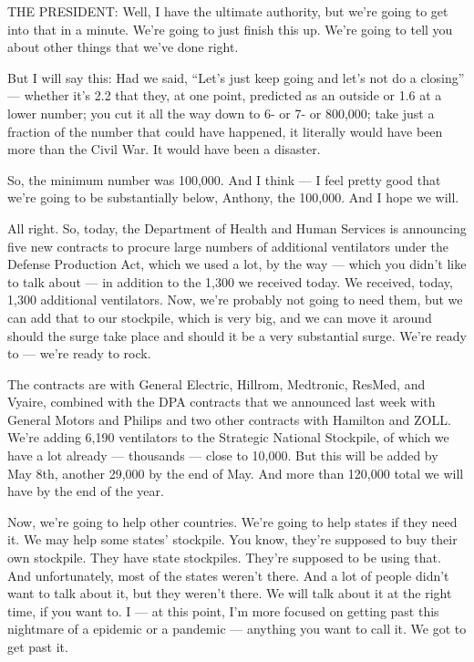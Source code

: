 THE PRESIDENT: Well, I have the ultimate authority, but we're going to
get into that in a minute. We're going to just finish this up. We're
going to tell you about other things that we've done right.

But I will say this: Had we said, ``Let's just keep going and let's not
do a closing'' --- whether it's 2.2 that they, at one point, predicted
as an outside or 1.6 at a lower number; you cut it all the way down to
6- or 7- or 800,000; take just a fraction of the number that could have
happened, it literally would have been more than the Civil War. It would
have been a disaster.

So, the minimum number was 100,000. And I think --- I feel pretty good
that we're going to be substantially below, Anthony, the 100,000. And I
hope we will.

All right. So, today, the Department of Health and Human Services is
announcing five new contracts to procure large numbers of additional
ventilators under the Defense Production Act, which we used a lot, by
the way --- which you didn't like to talk about --- in addition to the
1,300 we received today. We received, today, 1,300 additional
ventilators. Now, we're probably not going to need them, but we can add
that to our stockpile, which is very big, and we can move it around
should the surge take place and should it be a very substantial surge.
We're ready to --- we're ready to rock.

The contracts are with General Electric, Hillrom, Medtronic, ResMed, and
Vyaire, combined with the DPA contracts that we announced last week with
General Motors and Philips and two other contracts with Hamilton and
ZOLL. We're adding 6,190 ventilators to the Strategic National
Stockpile, of which we have a lot already --- thousands --- close to
10,000. But this will be added by May 8th, another 29,000 by the end of
May. And more than 120,000 total we will have by the end of the year.

Now, we're going to help other countries. We're going to help states if
they need it. We may help some states' stockpile. You know, they're
supposed to buy their own stockpile. They have state stockpiles. They're
supposed to be using that. And unfortunately, most of the states weren't
there. And a lot of people didn't want to talk about it, but they
weren't there. We will talk about it at the right time, if you want to.
I --- at this point, I'm more focused on getting past this nightmare of
a epidemic or a pandemic --- anything you want to call it. We got to get
past it.

